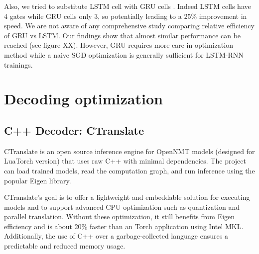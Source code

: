 \documentclass[11pt,a4paper]{article}
\begin{document}
Also, we tried to substitute LSTM  cell with GRU cells . Indeed LSTM cells have 4 gates while GRU cells only 3, so potentially leading to a 25\% improvement in speed. We are not aware of any comprehensive study comparing relative efficiency of GRU vs LSTM. Our findings show that almost similar performance can be reached (see figure XX). However, GRU requires more care in optimization method while a naive SGD optimization is generally sufficient for LSTM-RNN trainings.

\section{Decoding optimization}




\subsection{C++ Decoder: CTranslate}

CTranslate is an open source inference engine for OpenNMT models (designed for LuaTorch version) that uses raw C++ with minimal dependencies. The project can load trained models, read the computation graph, and run inference using the popular Eigen library.

CTranslate's goal is to offer a lightweight and embeddable solution for executing models and to support advanced CPU optimization such as quantization and parallel translation. Without these optimization, it still benefits from Eigen efficiency and is about 20\% faster than an Torch application using Intel MKL. Additionally, the use of C++ over a garbage-collected language ensures a predictable and reduced memory usage.
\end{document}
